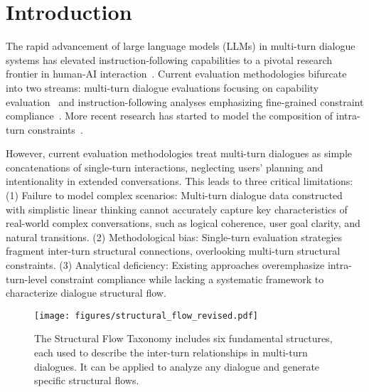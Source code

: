 \section{Introduction}

The rapid advancement of large language models (LLMs) in multi-turn dialogue systems has elevated instruction-following capabilities to a pivotal research frontier in human-AI interaction~\cite{chang2024survey}.
Current evaluation methodologies bifurcate into two streams: multi-turn dialogue evaluations focusing on capability evaluation~\cite{zheng2023judging,bai-etal-2024-mt,kwan-etal-2024-mt} and instruction-following analyses emphasizing fine-grained constraint compliance~\cite{jiang-etal-2024-followbench,he2024can,zhang2024cfbench}. 
More recent research has started to model the composition of intra-turn constraints~\cite{wen2024benchmarking}.

However, current evaluation methodologies treat multi-turn dialogues as simple concatenations of single-turn interactions, neglecting users' planning and intentionality in extended conversations.
This leads to three critical limitations: (1) Failure to model complex scenarios: Multi-turn dialogue data constructed with simplistic linear thinking cannot accurately capture key characteristics of real-world complex conversations, such as logical coherence, user goal clarity, and natural transitions.
(2) Methodological bias: Single-turn evaluation strategies fragment inter-turn structural connections, overlooking multi-turn structural constraints.
(3) Analytical deficiency: Existing approaches overemphasize intra-turn-level constraint compliance while lacking a systematic framework to characterize dialogue structural flow.

\begin{figure}[t!]
    \captionsetup{skip=0pt}
	\centering
	\texttt{[image: figures/structural\_flow\_revised.pdf]}
	\caption{The Structural Flow Taxonomy includes six fundamental structures, each used to describe the inter-turn relationships in multi-turn dialogues. It can be applied to analyze any dialogue and generate specific structural flows.}
	\label{fig:intro}
\end{figure}

